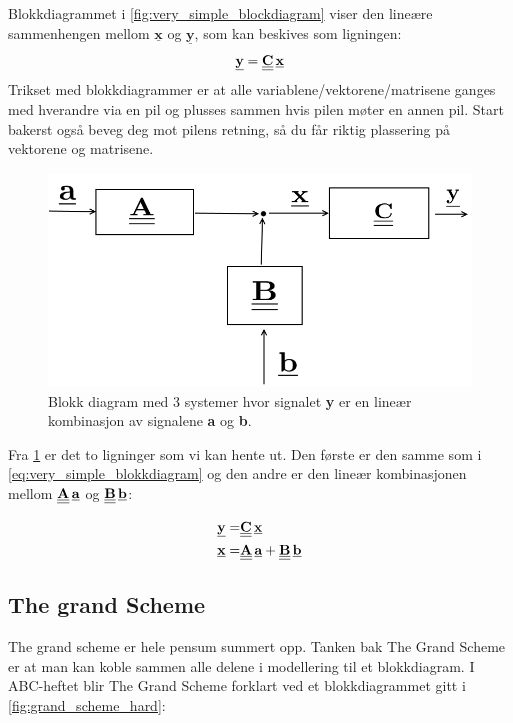 Blokkdiagrammet i \cref{fig:very_simple_blockdiagram} viser den lineære sammenhengen mellom $\underline{\textbf{x}}$ og $\underline{\textbf{y}}$, som kan beskives som ligningen: 
\begin{equation}
    \label{eq:very_simple_blokkdiagram}
    \underline{\textbf{y}} = \underline{\underline{\textbf{C}}}\,\underline{\textbf{x}}
\end{equation}
Trikset med blokkdiagrammer er at alle variablene/vektorene/matrisene ganges med hverandre via en pil og plusses sammen hvis pilen møter en annen pil. Start bakerst også beveg deg mot pilens retning, så du får riktig plassering på vektorene og matrisene.

\begin{figure}[H]
    \centering
    \includegraphics[scale=0.5]{Figures/simple_blockdiagram.png}
    \caption{Blokk diagram med 3 systemer hvor signalet \textbf{y} er en lineær kombinasjon av signalene \textbf{a} og \textbf{b}.}
    \label{fig:simple_blokkdiagram1}
\end{figure}

Fra \cref{fig:simple_blokkdiagram1} er det to ligninger som vi kan hente ut. Den første er den samme som i \cref{eq:very_simple_blokkdiagram} og den andre er den lineær kombinasjonen mellom $\underline{\underline{\textbf{A}}}\,\underline{\textbf{a}}$ og $\underline{\underline{\textbf{B}}}\,\underline{\textbf{b}}$:

\begin{align}
       \label{eq:simple_blokkdiagram}
    \underline{\textbf{y}} =& \underline{\underline{\textbf{C}}}\,\underline{\textbf{x}} \\
    \underline{\textbf{x}} =& \underline{\underline{\textbf{A}}}\,\underline{\textbf{a}} + \underline{\underline{\textbf{B}}}\,\underline{\textbf{b}}
\end{align}

\subsection{The grand Scheme}
The grand scheme er hele pensum summert opp. Tanken bak The Grand Scheme er at man kan koble sammen alle delene i modellering til et blokkdiagram. I ABC-heftet blir The Grand Scheme forklart ved et blokkdiagrammet gitt i \cref{fig:grand_scheme_hard}:

